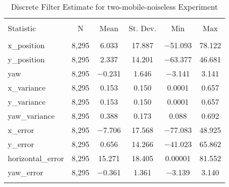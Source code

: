 
\begin{table}[h] \centering 
  \caption{Discrete Filter Estimate for two-mobile-noiseless Experiment} 
  \label{tab:two_mobile_noiseless_discrete_summary} 
\begin{tabular}{@{\extracolsep{5pt}}lccccc} 
\\[-1.8ex]\hline 
\hline \\[-1.8ex] 
Statistic & \multicolumn{1}{c}{N} & \multicolumn{1}{c}{Mean} & \multicolumn{1}{c}{St. Dev.} & \multicolumn{1}{c}{Min} & \multicolumn{1}{c}{Max} \\ 
\hline \\[-1.8ex] 
x\_position & 8,295 & 6.033 & 17.887 & $-$51.093 & 78.122 \\ 
y\_position & 8,295 & 2.337 & 14.201 & $-$63.377 & 46.681 \\ 
yaw & 8,295 & $-$0.231 & 1.646 & $-$3.141 & 3.141 \\ 
x\_variance & 8,295 & 0.153 & 0.150 & 0.0001 & 0.657 \\ 
y\_variance & 8,295 & 0.153 & 0.150 & 0.0001 & 0.657 \\ 
yaw\_variance & 8,295 & 0.388 & 0.173 & 0.088 & 0.692 \\ 
x\_error & 8,295 & $-$7.706 & 17.568 & $-$77.083 & 48.925 \\ 
y\_error & 8,295 & 0.656 & 14.266 & $-$41.023 & 65.862 \\ 
horizontal\_error & 8,295 & 15.271 & 18.405 & 0.00001 & 81.552 \\ 
yaw\_error & 8,295 & $-$0.361 & 1.361 & $-$3.139 & 3.140 \\ 
\hline \\[-1.8ex] 
\end{tabular} 
\end{table} 
